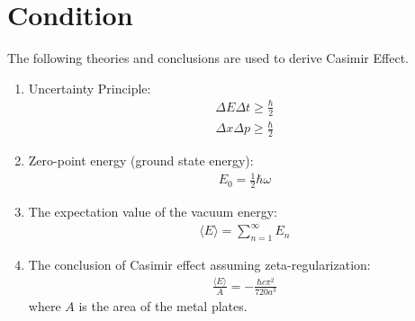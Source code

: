 \section{Condition}
The following theories and conclusions are used to derive Casimir Effect.
\begin{enumerate}
    \item Uncertainty Principle:
        \begin{align}\Delta E \Delta t \ge \frac{\hbar}{2}\end{align}
        \begin{align}\Delta x \Delta p \ge \frac{\hbar}{2}\end{align}
    \item Zero-point energy (ground state energy): \begin{align}E_0 = \frac{1}{2}\hbar\omega\end{align}
    \item The expectation value of the vacuum energy: \begin{align}\langle E \rangle = \sum_{n=1}^{\infty} E_n\end{align}
    \item The conclusion of Casimir effect assuming zeta-regularization: 
    \begin{align}\frac{\langle E \rangle}{A} = -\frac{\hbar c \pi^2}{720 a^3}\end{align}
    where \(A\) is the area of the metal plates.
\end{enumerate}